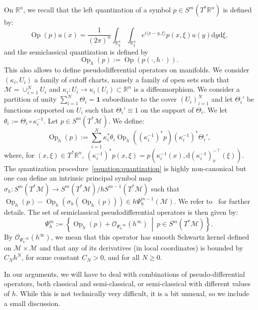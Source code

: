 \documentclass[10pt]{amsart}
\theoremstyle{definition}\newtheorem{defi}[theo]{Definition}\newtheorem{rema}[theo]{Remark}\newtheorem{exam}[theo]{Example}\newtheorem{exem}[theo]{Example}\newtheorem{nota}[theo]{Notation}
\newcommand{\R}{\mathbb{R}}
\newcommand{\bfun}{\mathbf{1}}
\newcommand{\mc}{\mathcal}
\newcommand{\M}{\mathcal{M}}
\newcommand{\dd}{\mathrm{d}}
\DeclareMathOperator{\Op}{Op}
\begin{document}
On $\R^n$, we recall that the left quantization of a symbol $p \in S^m(T^*\R^n)$ is defined by:
\[
\Op(p)u(x) = \frac{1}{(2\pi)^n}\int_{\R^n_y} \int_{\R^n_\xi} e^{i \langle x-y,\xi\rangle} p\left(x,\xi\right) u(y) \dd y \dd \xi,
\]
and the semiclassical quantization is defined by
\[
\Op_h(p) := \Op(p(\cdot, h\cdot)).
\]
This also allows to define pseudodifferential operators on manifolds. We consider $(\kappa_i,U_i)$ a family of cutoff charts, namely a family of open sets such that $\M = \cup_{i=1}^N U_i$ and $\kappa_i : U_i \rightarrow \kappa_i(U_i) \subset \R^n$ is a diffeomorphism. We consider a partition of unity $\sum_{i=1}^N \Theta_i = \bfun$ subordinate to the cover $(U_i)_{i=1}^N$ and let $\Theta_i'$ be functions supported on $U_i$ such that $\Theta_i' \equiv 1$ on the support of $\Theta_i$. We let $\theta_i := \Theta_i \circ \kappa_i^{-1}$. Let $p \in S^m(T^*\M)$. We define:
\begin{equation}\label{equation:quantization}
\Op_h(p) := \sum_{i=1}^N \kappa_i^*\theta_i \Op_h\left(\left(\kappa_i^{-1}\right)^*p\right) \left(\kappa_i^{-1}\right)^*\Theta_i',
\end{equation}
where, for $(x,\xi) \in T^*\R^n$, $(\kappa_i^{-1})^*p(x,\xi) = p(\kappa_i^{-1}(x), \dd (\kappa_i^{-1})^{-\top}_x(\xi))$. The quantization procedure~\eqref{equation:quantization} is highly non-canonical but one can define an intrinsic principal symbol map $\sigma_h : S^m(T^*\M) \rightarrow S^m(T^*\M)/hS^{m-1}(T^*\M)$ such that $\Op_h(p) - \Op_h(\sigma_h(\Op_h(p))) \in h \Psi^{m-1}_h(\M)$. We refer to~\cite[Appendix~E]{Dyatlov-Zworski-19} for further details. The set of semiclassical pseudodifferential operators is then given by:
\[
\Psi^m_h := \left\{ \Op_h(p) + \mc{O}_{\Psi^{-\infty}_h}(h^\infty)~\middle|~p \in S^m(T^*\M)\right\}.
\]
By $\mc{O}_{\Psi^{-\infty}_h}(h^\infty)$, we mean that this operator has smooth Schwartz kernel defined on $\M \times \M$ and that any of its derivatives (in local coordinates) is bounded by $C_N h^N$, for some constant $C_N > 0$, and for all $N \geq 0$.

In our arguments, we will have to deal with combinations of pseudo-differential operators, both classical and semi-classical, or semi-classical with different values of $h$. While this is not technically very difficult, it is a bit unusual, so we include a small discussion.
\end{document}
